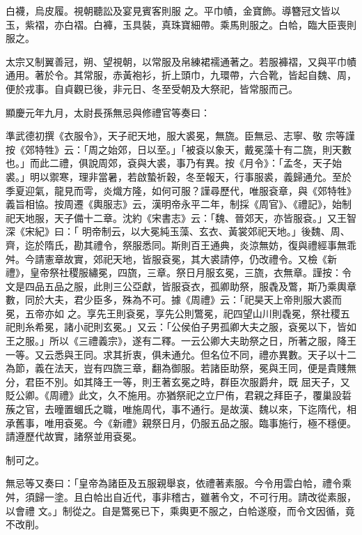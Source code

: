 \begin{pinyinscope}
 白襪，烏皮履。視朝聽訟及宴見賓客則服
 之。平巾幘，金寶飾。導簪冠文皆以玉，紫褶，亦白褶。白褲，玉具裝，真珠寶細帶。乘馬則服之。白帢，臨大臣喪則服之。



 太宗又制翼善冠，朔、望視朝，以常服及帛練裙襦通著之。若服褲褶，又與平巾幘通用。著於令。其常服，赤黃袍衫，折上頭巾，九環帶，六合靴，皆起自魏、周，便於戎事。自貞觀已後，非元日、冬至受朝及大祭祀，皆常服而己。



 顯慶元年九月，太尉長孫無忌與修禮官等奏曰：



 準武德初撰《衣服令》，天子祀天地，服大裘冕，無旒。臣無忌、志寧、敬
 宗等謹按《郊特牲》云：「周之始郊，日以至。」「被袞以象天，戴冕藻十有二旒，則天數也。」而此二禮，俱說周郊，袞與大裘，事乃有異。按《月令》：「孟冬，天子始裘。」明以禦寒，理非當暑，若啟蟄祈穀，冬至報天，行事服裘，義歸通允。至於季夏迎氣，龍見而雩，炎熾方隆，如何可服？謹尋歷代，唯服袞章，與《郊特牲》義旨相協。按周遷《輿服志》云，漢明帝永平二年，制採《周官》、《禮記》，始制祀天地服，天子備十二章。沈約《宋書志》云：「魏、晉郊天，亦皆服袞。」又王智深《宋紀》曰：「
 明帝制云，以大冕純玉藻、玄衣、黃裳郊祀天地。」後魏、周、齊，迄於隋氏，勘其禮令，祭服悉同。斯則百王通典，炎涼無妨，復與禮經事無乖舛。今請憲章故實，郊祀天地，皆服袞冕，其大裘請停，仍改禮令。又檢《新禮》，皇帝祭社稷服繡冕，四旒，三章。祭日月服玄冕，三旒，衣無章。謹按：令文是四品五品之服，此則三公亞獻，皆服袞衣，孤卿助祭，服毳及鷩，斯乃乘輿章數，同於大夫，君少臣多，殊為不可。據《周禮》云：「祀昊天上帝則服大裘而冕，五帝亦如
 之。享先王則袞冕，享先公則鷩冕，祀四望山川則毳冕，祭社稷五祀則糸希冕，諸小祀則玄冕。」又云：「公侯伯子男孤卿大夫之服，袞冕以下，皆如王之服。」所以《三禮義宗》，遂有二釋。一云公卿大夫助祭之日，所著之服，降王一等。又云悉與王同。求其折衷，俱未通允。但名位不同，禮亦異數。天子以十二為節，義在法天，豈有四旒三章，翻為御服。若諸臣助祭，冕與王同，便是貴賤無分，君臣不別。如其降王一等，則王著玄冕之時，群臣次服爵弁，既
 屈天子，又貶公卿。《周禮》此文，久不施用。亦猶祭祀之立尸侑，君親之拜臣子，覆巢設硩蔟之官，去曈置蟈氏之職，唯施周代，事不通行。是故漢、魏以來，下迄隋代，相承舊事，唯用袞冕。今《新禮》親祭日月，仍服五品之服。臨事施行，極不穩便。請遵歷代故實，諸祭並用袞冕。



 制可之。



 無忌等又奏曰：「皇帝為諸臣及五服親舉哀，依禮著素服。今令用雲白帢，禮令乘舛，須歸一塗。且白帢出自近代，事非稽古，雖著令文，不可行用。請改從素服，以會禮
 文。」制從之。自是鷩冕已下，乘輿更不服之，白帢遂廢，而令文因循，竟不改削。




\end{pinyinscope}
